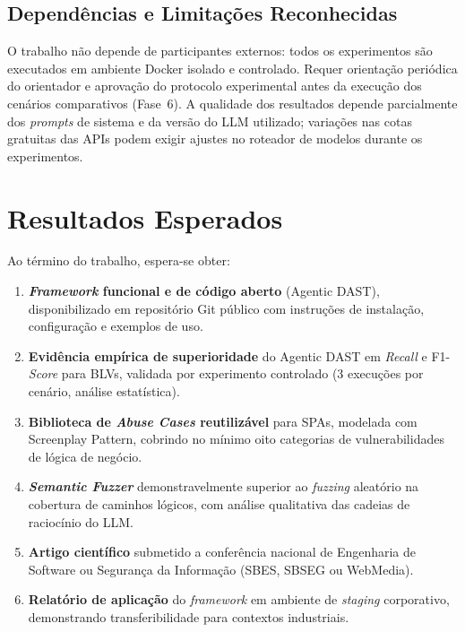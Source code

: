 \documentclass[
    12pt,
    openany,
    oneside,
    a4paper,
    brazil
]{abntex2}
\begin{document}
\section{Dependências e Limitações Reconhecidas}

O trabalho não depende de participantes externos: todos os experimentos
são executados em ambiente Docker isolado e controlado. Requer
orientação periódica do orientador e aprovação do protocolo
experimental antes da execução dos cenários comparativos (Fase~6). A
qualidade dos resultados depende parcialmente dos \textit{prompts} de
sistema e da versão do LLM utilizado; variações nas cotas gratuitas das
APIs podem exigir ajustes no roteador de modelos durante os
experimentos.

\chapter{Resultados Esperados}

Ao término do trabalho, espera-se obter:

\begin{enumerate}
  \item \textbf{\textit{Framework} funcional e de código aberto}
  (Agentic DAST), disponibilizado em repositório Git público com
  instruções de instalação, configuração e exemplos de uso.

  \item \textbf{Evidência empírica de superioridade} do Agentic DAST
  em \textit{Recall} e F1-\textit{Score} para BLVs, validada por
  experimento controlado (3 execuções por cenário, análise estatística).

  \item \textbf{Biblioteca de \textit{Abuse Cases} reutilizável} para
  SPAs, modelada com Screenplay Pattern, cobrindo no mínimo oito
  categorias de vulnerabilidades de lógica de negócio.

  \item \textbf{\textit{Semantic Fuzzer}} demonstravelmente superior ao
  \textit{fuzzing} aleatório na cobertura de caminhos lógicos, com
  análise qualitativa das cadeias de raciocínio do LLM.

  \item \textbf{Artigo científico} submetido a conferência nacional de
  Engenharia de Software ou Segurança da Informação (SBES, SBSEG ou
  WebMedia).

  \item \textbf{Relatório de aplicação} do \textit{framework} em
  ambiente de \textit{staging} corporativo, demonstrando
  transferibilidade para contextos industriais.
\end{enumerate}
\end{document}
